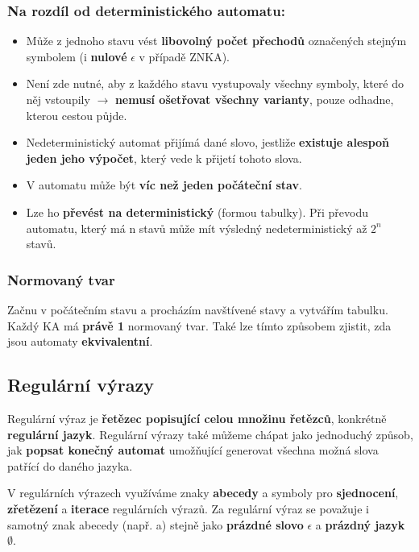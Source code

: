 \subsubsection*{Na rozdíl od deterministického automatu:}
\begin{itemize}
	\item Může z jednoho stavu vést \textbf{libovolný počet přechodů} označených stejným symbolem (i \textbf{nulové} $\epsilon$ v případě ZNKA). 
	\item Není zde nutné, aby z každého stavu vystupovaly všechny symboly, které do něj vstoupily $\rightarrow$ \textbf{nemusí ošetřovat všechny varianty}, pouze odhadne, kterou cestou půjde.
	\item Nedeterministický automat přijímá dané slovo, jestliže \textbf{existuje alespoň jeden jeho výpočet}, který vede k přijetí tohoto slova.
	\item V automatu může být \textbf{víc než jeden počáteční stav}.
	\item Lze ho \textbf{převést na deterministický} (formou tabulky). Při převodu automatu, který má n stavů může mít výsledný nedeterministický až $2^n$ stavů.
\end{itemize}


\subsubsection{Normovaný tvar}
Začnu v počátečním stavu a procházím navštívené stavy a vytvářím tabulku. Každý KA má \textbf{právě 1} normovaný tvar. Také lze tímto způsobem zjistit, zda jsou automaty \textbf{ekvivalentní}.


\subsection{Regulární výrazy}
Regulární výraz je \textbf{řetězec popisující celou množinu řetězců}, konkrétně \textbf{regulární jazyk}. Regulární výrazy také můžeme chápat jako jednoduchý způsob, jak \textbf{popsat konečný automat} umožňující generovat všechna možná slova patřící do daného jazyka. 

V regulárních výrazech využíváme znaky \textbf{abecedy} a symboly pro \textbf{sjednocení}, \textbf{zřetězení} a \textbf{iterace} regulárních výrazů. Za regulární výraz se považuje i samotný znak abecedy (např. a) stejně jako \textbf{prázdné slovo} $\epsilon$ a \textbf{prázdný jazyk} $\emptyset$.

